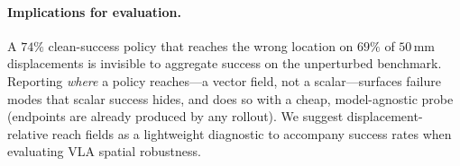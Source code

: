 \paragraph{Implications for evaluation.} A $74\%$ clean-success policy that reaches the wrong location on $69\%$ of $50$\,mm displacements is invisible to aggregate success on the unperturbed benchmark. Reporting \emph{where} a policy reaches---a vector field, not a scalar---surfaces failure modes that scalar success hides, and does so with a cheap, model-agnostic probe (endpoints are already produced by any rollout). We suggest displacement-relative reach fields as a lightweight diagnostic to accompany success rates when evaluating VLA spatial robustness.
